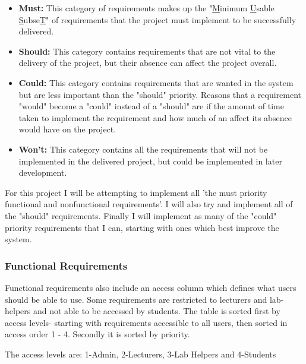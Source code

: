 \documentclass[12pt]{article}  %
\begin{document}
\begin{itemize}

\item \textbf{Must:} This category of requirements makes up the "\underline{M}inimum \underline{U}sable \underline{S}ubse\underline{T}" of requirements that the project must implement to be successfully delivered.

\item \textbf{Should:} This category contains requirements that are not vital to the delivery of the project, but their absence can affect the project overall. 

\item \textbf{Could:} This category contains requirements that are wanted in the system but are less important than the "should" priority. Reasons that a requirement "would" become a "could" instead of a "should" are if the amount of time taken to implement the requirement and how much of an affect its absence would have on the project.   

\item \textbf{Won't:} This category contains all the requirements that will not be implemented in the delivered project, but could be implemented in later development.
\end{itemize}

\noindent For this project I will be attempting to implement all 'the must priority functional and nonfunctional requirements'. I will also try and implement all of the "should" requirements. Finally I will implement as many of the "could" priority requirements that I can, starting with ones which best improve the system.


\def\arraystretch{1.5}
\subsubsection{Functional Requirements} \label{sec:func}

Functional requirements also include an access column which defines what users should be able to use. Some requirements are restricted to lecturers and lab-helpers and not able to be accessed by students. The table is sorted first by access levels- starting with requirements accessible to all users, then sorted in access order 1 - 4. Secondly it is sorted by priority.

The access levels are: 1-Admin, 2-Lecturers, 3-Lab Helpers and 4-Students
\end{document}
